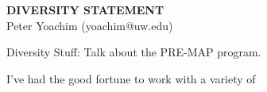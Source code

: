\documentclass[11pt]{article}
\begin{document}
\pagestyle{fancy}
\lhead{\textcolor{gray}{\it Peter Yoachim}}
\rhead{\textcolor{gray}{\thepage/\totalpages{}}}
\renewcommand{\headrulewidth}{0pt}
\renewcommand{\footrulewidth}{0pt}
\fancyfoot[C]{\footnotesize \textcolor{gray}{http://staff.washington.edu/yoachim/}}




\begin{center}
{\Large \bf DIVERSITY STATEMENT}\\
\vspace*{0.1cm}
{\normalsize Peter Yoachim (yoachim@uw.edu)}
\end{center}



Diversity Stuff:
Talk about the PRE-MAP program. 

  I've had the good fortune to work with a variety of 
\end{document}
